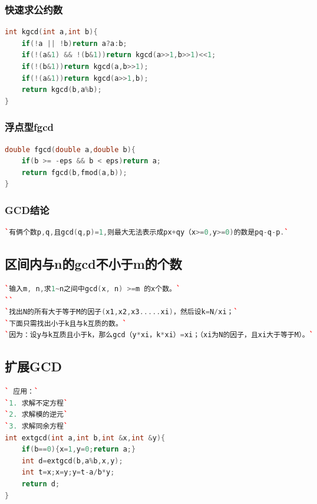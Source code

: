 \documentclass[a4paper]{article}
\begin{document}
\begin{CJK*}{UTF8}{gbsn}
\begin{multicols}{3}
\begin{flushleft}
\subsubsection{快速求公约数}
\begin{lstlisting}[language={c++}]
int kgcd(int a,int b){
	if(!a || !b)return a?a:b;
	if(!(a&1) && !(b&1))return kgcd(a>>1,b>>1)<<1;
	if(!(b&1))return kgcd(a,b>>1);
	if(!(a&1))return kgcd(a>>1,b);
	return kgcd(b,a%b);
}
\end{lstlisting}

\subsubsection{浮点型fgcd}
\begin{lstlisting}[language={c++}]
double fgcd(double a,double b){
    if(b >= -eps && b < eps)return a;
    return fgcd(b,fmod(a,b));
}
\end{lstlisting}

\subsubsection{GCD结论}
\begin{lstlisting}[language={c++}]
`有俩个数p,q,且gcd(q,p)=1,则最大无法表示成px+qy（x>=0,y>=0)的数是pq-q-p.`
\end{lstlisting}




\subsection{区间内与n的gcd不小于m的个数 }
\begin{lstlisting}[language={c++}]
`输入m, n,求1~n之间中gcd(x, n) >=m 的x个数。`
``
`找出N的所有大于等于M的因子(x1,x2,x3.....xi)，然后设k=N/xi；`
`下面只需找出小于k且与k互质的数。`
`因为：设y与k互质且小于k，那么gcd（y*xi，k*xi）=xi；（xi为N的因子，且xi大于等于M）。`
\end{lstlisting}

\subsection{扩展GCD}
\begin{lstlisting}[language={c++}]
` 应用：`
`1. 求解不定方程`
`2. 求解模的逆元`
`3. 求解同余方程`
int extgcd(int a,int b,int &x,int &y){
	if(b==0){x=1,y=0;return a;}
	int d=extgcd(b,a%b,x,y);
	int t=x;x=y;y=t-a/b*y;
	return d;
}
\end{lstlisting}



\end{flushleft}
\end{multicols}
\end{CJK*}
\end{document}
